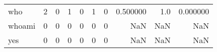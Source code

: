 \begin{longtable}{lrrrrrrrrr}
who       &                                                  2 &                                                  0 &                                                  1 &                                                  0 &                                                  1 &                                                  0 &                                           0.500000 &                                    1.0 &                             0.000000 \\
whoami    &                                                  0 &                                                  0 &                                                  0 &                                                  0 &                                                  0 &                                                  0 &                                                NaN &                                    NaN &                                  NaN \\
yes       &                                                  0 &                                                  0 &                                                  0 &                                                  0 &                                                  0 &                                                  0 &                                                NaN &                                    NaN &                                  NaN \\
\end{longtable}
